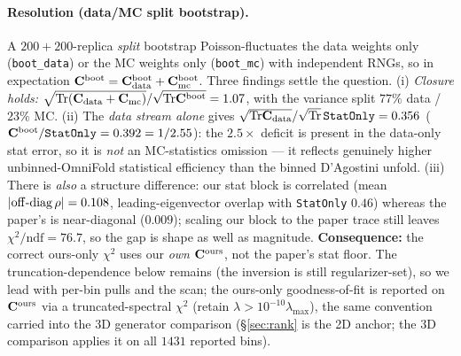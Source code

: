 \paragraph{Resolution (data/MC split bootstrap).}
A $200{+}200$-replica \emph{split} bootstrap Poisson-fluctuates the
data weights only (\texttt{boot\_data}) or the MC weights only (\texttt{boot\_mc})
with independent RNGs, so in expectation
$\mathbf{C}^{\text{boot}}=\mathbf{C}^{\text{boot}}_{\mathrm{data}}+\mathbf{C}^{\text{boot}}_{\mathrm{mc}}$.
Three findings settle the question. (i) \emph{Closure holds:}
$\sqrt{\mathrm{Tr}(\mathbf{C}_{\mathrm{data}}+\mathbf{C}_{\mathrm{mc}})}/
\sqrt{\mathrm{Tr}\mathbf{C}^{\text{boot}}}=1.07$, with the variance split $77\%$ data /
$23\%$ MC. (ii) The \emph{data stream alone} gives
$\sqrt{\mathrm{Tr}\mathbf{C}_{\mathrm{data}}}/\sqrt{\mathrm{Tr}}\,\texttt{StatOnly}=0.356$
($\mathbf{C}^{\text{boot}}/\texttt{StatOnly}=0.392=1/2.55$): the $2.5\times$ deficit is
present in the data-only stat error, so it is \emph{not} an MC-statistics
omission --- it reflects genuinely higher unbinned-OmniFold statistical
efficiency than the binned D'Agostini unfold. (iii) There is \emph{also} a
structure difference: our stat block is correlated (mean
$|{\rm off\text{-}diag}\,\rho|=0.108$, leading-eigenvector overlap with
\texttt{StatOnly} $0.46$) whereas the paper's is near-diagonal ($0.009$); scaling
our block to the paper trace still leaves $\chi^{2}/\mathrm{ndf}=76.7$, so the gap
is shape as well as magnitude. \textbf{Consequence:} the correct ours-only
$\chi^{2}$ uses our \emph{own} $\mathbf{C}^{\text{ours}}$, not the paper's stat floor.
The truncation-dependence below remains (the inversion is still regularizer-set),
so we lead with per-bin pulls and the scan; the ours-only goodness-of-fit
is reported on $\mathbf{C}^{\text{ours}}$
via a truncated-spectral $\chi^{2}$ (retain $\lambda>10^{-10}\lambda_{\max}$), the
same convention carried into the 3D generator comparison (\S\ref{sec:rank} is the
2D anchor; the 3D comparison applies it on all $1431$ reported bins).

